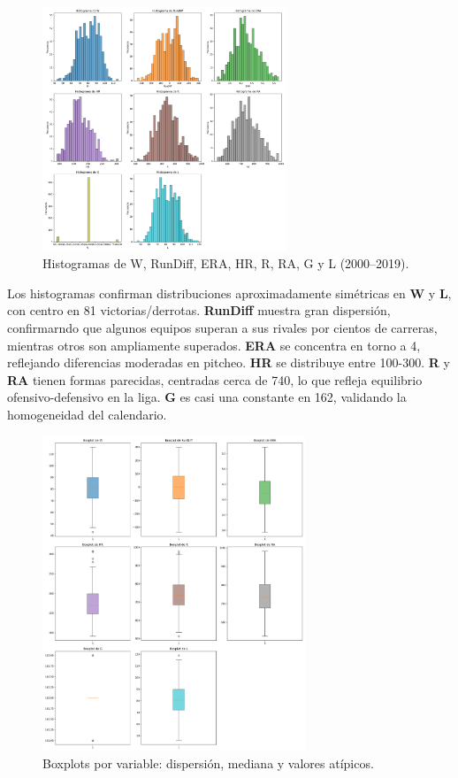 \documentclass[man,floatsintext]{apa7}
\begin{document}
\begin{figure}[H]
    \centering
    \includegraphics[width=0.65\textwidth]{../plots/final_version/all_histograms.png}
    \caption{Histogramas de W, RunDiff, ERA, HR, R, RA, G y L (2000--2019).}
\end{figure}

Los histogramas confirman distribuciones aproximadamente simétricas en \textbf{W} y \textbf{L}, con centro en 81 victorias/derrotas. 
\textbf{RunDiff} muestra gran dispersión, confirmarndo que algunos equipos superan a sus rivales por cientos de carreras, mientras otros son ampliamente superados. 
\textbf{ERA} se concentra en torno a 4, reflejando diferencias moderadas en pitcheo. 
\textbf{HR} se distribuye entre 100-300.
\textbf{R} y \textbf{RA} tienen formas parecidas, centradas cerca de 740, lo que refleja equilibrio ofensivo-defensivo en la liga. 
\textbf{G} es casi una constante en 162, validando la homogeneidad del calendario.

\begin{figure}[H]
    \centering
    \includegraphics[width=0.7\textwidth]{../plots/final_version/all_boxplots.png}
    \caption{Boxplots por variable: dispersión, mediana y valores atípicos.}
\end{figure}
\end{document}
